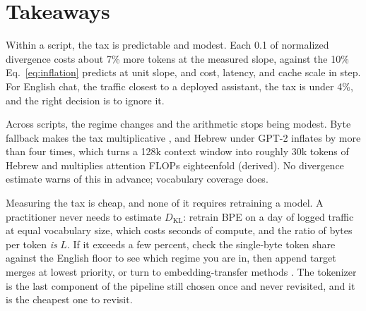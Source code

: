 \documentclass{article}
\begin{document}
\section{Takeaways}
\label{sec:takeaways}

Within a script, the tax is predictable and modest. Each 0.1 of normalized divergence costs about 7\% more tokens at the measured slope, against the 10\% Eq.~\eqref{eq:inflation} predicts at unit slope, and cost, latency, and cache scale in step. For English chat, the traffic closest to a deployed assistant, the tax is under 4\%, and the right decision is to ignore it.

Across scripts, the regime changes and the arithmetic stops being modest. Byte fallback makes the tax multiplicative \citep{petrov2023language}, and Hebrew under GPT-2 inflates by more than four times, which turns a 128k context window into roughly 30k tokens of Hebrew and multiplies attention FLOPs eighteenfold (derived). No divergence estimate warns of this in advance; vocabulary coverage does.

Measuring the tax is cheap, and none of it requires retraining a model. A practitioner never needs to estimate $D_{\mathrm{KL}}$: retrain BPE on a day of logged traffic at equal vocabulary size, which costs seconds of compute, and the ratio of bytes per token \emph{is} $L$. If it exceeds a few percent, check the single-byte token share against the English floor to see which regime you are in, then append target merges at lowest priority, or turn to embedding-transfer methods \citep{minixhofer2022wechsel,dobler2023focus,minixhofer2024zett}. The tokenizer is the last component of the pipeline still chosen once and never revisited, and it is the cheapest one to revisit.



\end{document}
